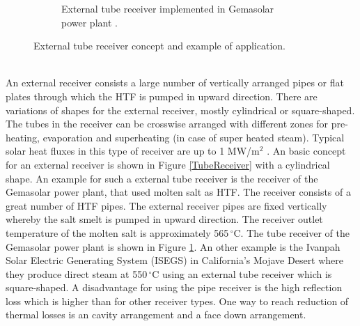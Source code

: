 \documentclass[Master,MEE,english]{twbook}%
\begin{document}
\begin{figure}[!htbp]
\begin{subfigure}[b]{0.5\textwidth}
                \caption{External tube receiver implemented in Gemasolar power plant \cite{Microtherm2012}.}\label{Gemasolar_tower_heatshield}
        \end{subfigure}
        \caption[External tube receiver concept and example of application.]{External tube receiver concept and example of application.}\label{TubeReceiverConceptGemasolar}
\end{figure}
\\
An external receiver consists a large number of vertically arranged pipes or flat plates through which the HTF is pumped in upward direction. There are variations of shapes for the external receiver, mostly cylindrical or square-shaped. The tubes in the receiver can be crosswise arranged with different zones for pre-heating, evaporation and superheating (in case of super heated steam). Typical solar heat fluxes in this type of receiver are up to 1 MW/m$^2$ \cite{Pitz-Paal.2013}. An basic concept for an external receiver is shown in Figure \ref{TubeReceiver} with a cylindrical shape. An example for such a external tube receiver is the receiver of the Gemasolar power plant, that used molten salt as HTF. The receiver consists of a great number of HTF pipes. The external receiver pipes are fixed vertically whereby the salt smelt is pumped in upward direction. The receiver outlet temperature of the molten salt is approximately 565$\,^{\circ}\mathrm{C}$. The tube receiver of the Gemasolar power plant is shown in Figure \ref{Gemasolar_tower_heatshield}. An other example  is the Ivanpah Solar Electric Generating System (ISEGS) in California’s Mojave Desert where they produce direct steam at 550$\,^{\circ}\mathrm{C}$ using an external tube receiver which is square-shaped. A disadvantage for using the pipe receiver is the high reflection loss which is higher than for other receiver types. One way to reach reduction of thermal losses is an cavity arrangement and a face down arrangement. \cite{Hoffschmidt2014}
\end{document}
